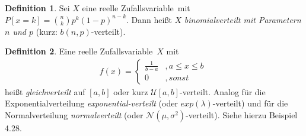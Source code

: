 \documentclass[a4paper,12pt,fleqn]{scrartcl}
\newcommand{\m}[1]{\mathcal{ #1 }}
\newcommand{\ZV}{Zufallsvariable}
\theoremstyle{definition}
\newtheorem{definition}{Definition}[section]
\theoremstyle{plain}
\theoremstyle{remark}
\begin{document}
\begin{definition}
Sei $X$ eine reelle \ZV \, mit $P[x = k] = \binom{n}{k} p^k (1-p)^{n-k}$. Dann heißt $X$ \emph{binomialverteilt mit Parametern $n$ und $p$} (kurz: $b(n,p)$-verteilt).
\end{definition}
\begin{definition}
Eine reelle \ZV \, $X$ mit
 \begin{align*}
f(x)=\begin{cases}\frac{1}{b-a}&,a\leq x\leq b\\
0&,sonst
\end{cases}\
\end{align*}
heißt \emph{gleichverteilt} auf $[a,b]$ oder kurz $\m{U}[a,b]$-verteilt. Analog für die Exponentialverteilung \emph{exponential-verteilt} (oder $exp(\lambda)$-verteilt) und für die Normalverteilung \emph{normalverteilt} (oder $ \m{N}( \mu , \sigma^2)$-verteilt). Siehe hierzu Beispiel 4.28.
\end{definition}
\end{document}
